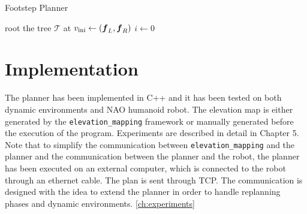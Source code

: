 \begin{algorithm}
  \caption{Footstep Planner}
  \label{alg:footstep-planner}
  root the tree $\mathcal{T}$ at $v_{\rm ini} \leftarrow ({\mbox{\boldmath $f$}}_L, {\mbox{\boldmath $f$}}_R)$\;
  $i \leftarrow 0$\;
\end{algorithm}

\section{Implementation}
The planner has been implemented in C++ and it has been tested on both dynamic 
environments and NAO humanoid robot. The elevation map is either
generated by the 
\texttt{elevation\_mapping} framework or manually generated before the execution 
of the program. Experiments are described in detail in Chapter 5. Note that to 
simplify the communication between \texttt{elevation\_mapping} and the planner 
and the communication between the planner and the robot, the planner has been 
executed on an external computer, which is connected to the robot through 
an ethernet cable. The plan is sent through TCP. The communication is designed 
with the idea to extend the planner in order to handle replanning phases and
dynamic environments.
\ref{ch:experiments} 
